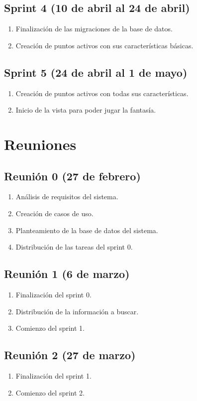 \subsection{Sprint 4 (10 de abril al 24 de abril)}
\begin{enumerate}
	\item Finalización de las migraciones de la base de datos.
	\item Creación de puntos activos con sus características básicas.
\end{enumerate}

\subsection{Sprint 5 (24 de abril al 1 de mayo)}
\begin{enumerate}
	\item Creación de puntos activos con todas sus características.
	\item Inicio de la vista para poder jugar la fantasía.
\end{enumerate}


\section{Reuniones}
\subsection{Reunión 0 (27 de febrero)}
\begin{enumerate}
	\item Análisis de requisitos del sistema.
	\item Creación de casos de uso.
	\item Planteamiento de la base de datos del sistema.
	\item Distribución de las tareas del sprint 0.
\end{enumerate}

\subsection{Reunión 1 (6 de marzo)}
\begin{enumerate}
	\item Finalización del sprint 0.
	\item Distribución de la información a buscar.
	\item Comienzo del sprint 1.
\end{enumerate}

\subsection{Reunión 2 (27 de marzo)}
\begin{enumerate}
	\item Finalización del sprint 1.
	\item Comienzo del sprint 2.
\end{enumerate}

